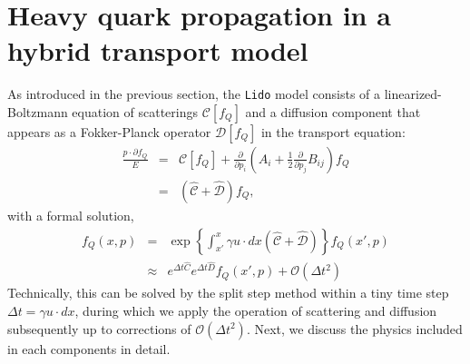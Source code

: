 \documentclass[aps, prc, reprint, amsmath, groupedaddress, nofootinbib]{revtex4-1}
\begin{document}
\section{Heavy quark propagation in a hybrid transport model}\label{section:model}
As introduced in the previous section, the {\tt Lido} model consists of a linearized-Boltzmann equation of scatterings $\mathcal{C}[f_Q]$ and a diffusion component that appears as a Fokker-Planck operator $\mathcal{D}[f_Q]$ in the transport equation:
\begin{eqnarray}
\nonumber
  \frac{p \cdot \partial f_Q}{E}  &=& 
\mathcal{C}[f_Q] + \frac{\partial}{\partial p_i}\left(A_i +\frac{1}{2}\frac{\partial}{\partial p_j}B_{ij} \right) f_Q \\
  &=& 
\left( \mathcal{\hat{C}} + \mathcal{\hat{D}} \right) f_Q,
\end{eqnarray}
with a formal solution,
\begin{eqnarray}
\nonumber
f_Q(x,p) &=& \exp\left\{ \int_{x'}^x \gamma u \cdot dx \left( \mathcal{\hat{C}} + \mathcal{\hat{D}} \right) \right\} f_Q(x',p)\\
&\approx & e^{\Delta t \hat{C}}e^{\Delta t \hat{D}} f_Q(x', p) + \mathcal{O}(\Delta t^2)
\end{eqnarray}
Technically, this can be solved by the split step method within a tiny time step $\Delta t = \gamma u \cdot dx$, during which we apply the operation of scattering and diffusion subsequently up to corrections of $\mathcal{O}(\Delta t^2)$.
Next, we discuss the physics included in each components in detail. 
\end{document}
